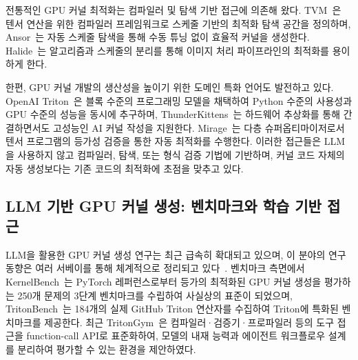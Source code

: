 \documentclass[sigplan,screen,review,anonymous]{acmart}
\begin{document}
전통적인 GPU 커널 최적화는 컴파일러 및 탐색 기반 접근에 의존해 왔다.
TVM~\cite{tvm_Chen2018TVMAA}은 텐서 연산을 위한 컴파일러 프레임워크로
스케줄 기반의 최적화 탐색 공간을 정의하며,
Ansor~\cite{zheng2020ansor}는 자동 스케줄 탐색을 통해 수동 튜닝 없이 효율적 커널을 생성한다.
Halide~\cite{halide_optimizing_parallelism}는 알고리즘과 스케줄의 분리를 통해
이미지 처리 파이프라인의 최적화를 용이하게 한다.

한편, GPU 커널 개발의 생산성을 높이기 위한 도메인 특화 언어도 발전하고 있다.
OpenAI Triton~\cite{tillet2019triton}은 블록 수준의 프로그래밍 모델을 채택하여
Python 수준의 사용성과 GPU 수준의 성능을 동시에 추구하며,
ThunderKittens~\cite{spector2024thunderkittens}는 하드웨어 추상화를 통해
간결하면서도 고성능인 AI 커널 작성을 지원한다.
Mirage~\cite{wu2025mirage}는 다층 슈퍼옵티마이저로서
텐서 프로그램의 등가성 검증을 통한 자동 최적화를 수행한다.
이러한 접근들은 LLM을 사용하지 않고 컴파일러, 탐색, 또는 형식 검증 기법에 기반하며,
커널 코드 자체의 자동 생성보다는 기존 코드의 최적화에 초점을 맞추고 있다.

\subsection{LLM 기반 GPU 커널 생성: 벤치마크와 학습 기반 접근}

LLM을 활용한 GPU 커널 생성 연구는 최근 급속히 확대되고 있으며,
이 분야의 연구 동향은 여러 서베이를 통해 체계적으로 정리되고 있다~\cite{yu2026automated_kernel_survey, zhang2026compilerstack, gong2025codeopt_survey}.
벤치마크 측면에서 KernelBench~\cite{ouyang2024kernelbench}는
PyTorch 레퍼런스로부터 등가의 최적화된 GPU 커널 생성을 평가하는
250개 문제의 3단계 벤치마크를 수립하여 사실상의 표준이 되었으며,
TritonBench~\cite{li2025tritonbench}는 184개의 실제 GitHub Triton 연산자를 수집하여
Triton에 특화된 벤치마크를 제공한다.
최근 TritonGym~\cite{tritongym2026}은 컴파일러·검증기·프로파일러 등의 도구 접근을
function-call API로 표준화하여, 모델의 내재 능력과 에이전트 워크플로우 설계를
분리하여 평가할 수 있는 환경을 제안하였다.
\end{document}
